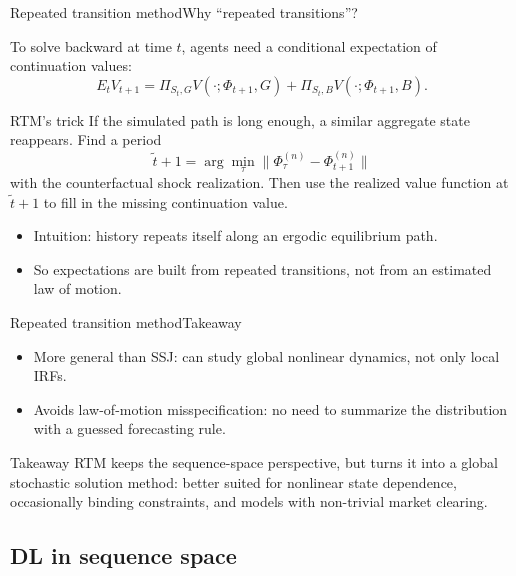 \documentclass[aspectratio=169]{beamer}
\begin{document}
\begin{frame}{Repeated transition method}{Why ``repeated transitions''?}
\small

To solve backward at time $t$, agents need a conditional expectation of continuation values:
\[
E_t V_{t+1}
=
\Pi_{S_t,G} V(\cdot;\Phi_{t+1},G)
+
\Pi_{S_t,B} V(\cdot;\Phi_{t+1},B).
\]

\begin{block}{RTM's trick}
If the simulated path is long enough, a similar aggregate state reappears.
Find a period
\[
\tilde t+1
=
\arg\min_{\tau}\|\Phi_{\tau}^{(n)}-\Phi_{t+1}^{(n)}\|
\]
with the \alert{counterfactual shock realization}.
Then use the realized value function at $\tilde t+1$ to fill in the missing continuation value.
\end{block}

\begin{itemize}
    \item Intuition: \alert{history repeats itself} along an ergodic equilibrium path.
    \item So expectations are built from \alert{repeated transitions}, not from an estimated law of motion.
\end{itemize}

\end{frame}

\begin{frame}{Repeated transition method}{Takeaway \cite{lee2025global}}
\small

\begin{itemize}
    \item \alert{More general than SSJ}: can study global nonlinear dynamics, not only local IRFs.
    \item \alert{Avoids law-of-motion misspecification}: no need to summarize the distribution with a guessed forecasting rule.
\end{itemize}

\begin{alertblock}{Takeaway}
RTM keeps the sequence-space perspective, but turns it into a \alert{global stochastic solution method}:
better suited for nonlinear state dependence, occasionally binding constraints, and models with non-trivial market clearing.
\end{alertblock}

\end{frame}

\subsection{DL in sequence space}
\end{document}
